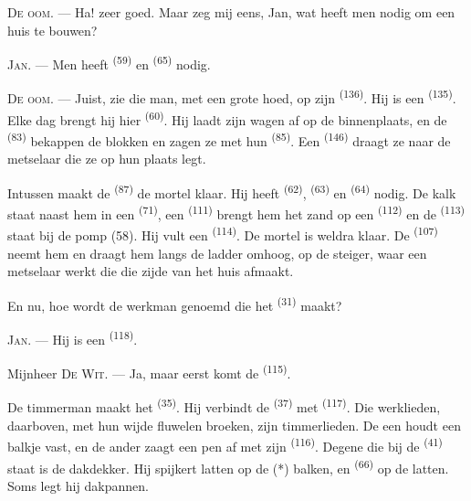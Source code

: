 \VUsaut{3.0mm}
\VUsaut{3.0mm}

\textsc{De oom}. --- Ha! zeer goed. Maar zeg mij eens, Jan, wat heeft men nodig om een huis te
bouwen?

\textsc{Jan}. --- Men heeft  \textsuperscript{(59)} en
 \textsuperscript{(65)} nodig.

\textsc{De oom}. --- Juist, zie die man, met een grote hoed, op zijn
 \textsuperscript{(136)}. Hij is een 
\textsuperscript{(135)}. Elke dag brengt hij hier 
\textsuperscript{(60)}. Hij laadt zijn wagen af op de binnenplaats, en de
 \textsuperscript{(83)} bekappen de blokken en zagen ze met
hun  \textsuperscript{(85)}. Een  \textsuperscript{(146)}
draagt ze naar de metselaar die ze op hun plaats legt.

Intussen maakt de  \textsuperscript{(87)} de mortel klaar. Hij heeft
 \textsuperscript{(62)},  \textsuperscript{(63)} en 
\textsuperscript{(64)} nodig. De kalk staat naast hem in een 
\textsuperscript{(71)}, een
 \textsuperscript{(111)} brengt hem het zand op een
 \textsuperscript{(112)} en de 
\textsuperscript{(113)} staat bij de pomp (58). Hij vult een 
\textsuperscript{(114)}. De mortel is weldra klaar. De 
\textsuperscript{(107)} neemt hem en draagt hem langs de ladder omhoog, op de steiger, waar
een metselaar werkt die die zijde van het huis afmaakt.

En nu, hoe wordt de werkman genoemd die het  \textsuperscript{(31)} maakt?

\textsc{Jan}. --- Hij is een  \textsuperscript{(118)}.

\VUsaut{3.0mm}
\VUsaut{3.0mm}

Mijnheer \textsc{De Wit}. --- Ja, maar eerst komt de 
\textsuperscript{(115)}.

De timmerman maakt het  \textsuperscript{(35)}. Hij verbindt de
 \textsuperscript{(37)} met  \textsuperscript{(117)}. Die
werklieden, daarboven, met hun wijde fluwelen broeken, zijn timmerlieden. De een houdt een
balkje vast, en de ander zaagt een pen af met zijn  \textsuperscript{(116)}.
Degene die bij de
 \textsuperscript{(41)} staat is de dakdekker. Hij spijkert
latten op de (*) balken, en  \textsuperscript{(66)} op de latten. Soms legt hij
dakpannen.

